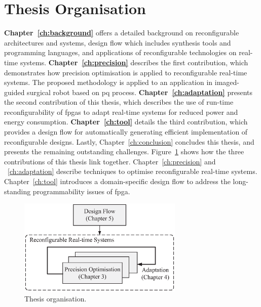 \section{Thesis Organisation}

\textbf{Chapter~\ref{ch:background}} offers a detailed background on reconfigurable architectures and systems, design flow which includes synthesis tools and programming languages, and applications of reconfigurable technologies on real-time systems.
\textbf{Chapter~\ref{ch:precision}} describes the first contribution, which demonstrates how precision optimisation is applied to reconfigurable real-time systems.
The proposed methodology is applied to an application in imaged-guided surgical robot based on \gls{pq} process. 
\textbf{Chapter~\ref{ch:adaptation}} presents the second contribution of this thesis, which describes the use of run-time reconfigurability of \glspl{fpga} to adapt real-time systems for reduced power and energy consumption.
\textbf{Chapter~\ref{ch:tool}} details the third contribution, which provides a design flow for automatically generating efficient implementation of reconfigurable designs.
Lastly, Chapter~\ref{ch:conclusion} concludes this thesis, and presents the remaining outstanding challenges.
Figure~\ref{fig:intro_organisation} shows how the three contributions of this thesis link together.
Chapter~\ref{ch:precision} and ~\ref{ch:adaptation} describe techniques to optimise reconfigurable real-time systems.
Chapter~\ref{ch:tool} introduces a domain-specific design flow to address the long-standing programmability issues of \gls{fpga}.

\begin{figure}[ht]
\begin{center}
\includegraphics[width=0.7\textwidth]{1_introduction/figures/organisation}
\end{center}
\caption{Thesis organisation.}
\label{fig:intro_organisation}
\end{figure}

